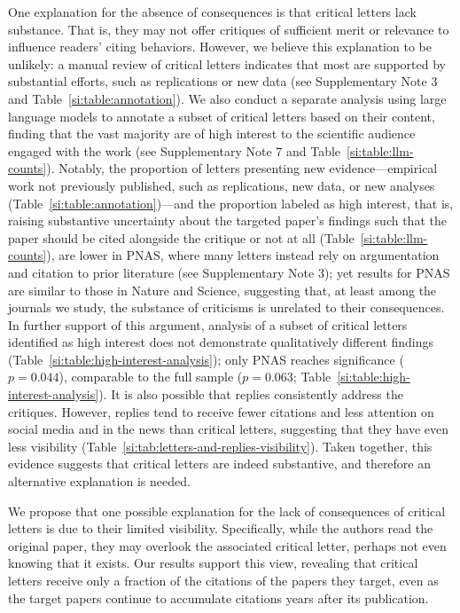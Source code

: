 \documentclass[12pt,a4paper]{article}
\numberwithin{equation}{section}
\begin{document}
One explanation for the absence of consequences is that critical letters lack substance.
That is, they may not offer critiques of sufficient merit or relevance to influence readers' citing behaviors.
However, we believe this explanation to be unlikely:
a manual review of critical letters indicates that most are supported by substantial efforts, such as replications or new data (see Supplementary Note 3 and Table~\ref{si:table:annotation}). 
We also conduct a separate analysis using large language models to annotate a subset of critical letters based on their content, finding that the vast majority are of high interest to the scientific audience engaged with the work (see Supplementary Note 7 and Table~\ref{si:table:llm-counts}). 
Notably, the proportion of letters presenting new evidence---empirical work not previously published, such as replications, new data, or new analyses (Table~\ref{si:table:annotation})---and the proportion labeled as high interest, that is, raising substantive uncertainty about the targeted paper's findings such that the paper should be cited alongside the critique or not at all (Table~\ref{si:table:llm-counts}), are lower in PNAS, where many letters instead rely on argumentation and citation to prior literature (see Supplementary Note 3);
yet results for PNAS are similar to those in Nature and Science, suggesting that, at least among the journals we study, the substance of criticisms is unrelated to their consequences.
In further support of this argument, analysis of a subset of critical letters identified as high interest does not demonstrate qualitatively different findings (Table~\ref{si:table:high-interest-analysis}); only PNAS reaches significance ($p = 0.044$), comparable to the full sample ($p = 0.063$; Table~\ref{si:table:high-interest-analysis}). 
It is also possible that replies consistently address the critiques.
However, replies tend to receive fewer citations and less attention on social media and in the news than critical letters, suggesting that they have even less visibility (Table~\ref*{si:tab:letters-and-replies-visibility}).
Taken together, this evidence suggests that critical letters are indeed substantive, and therefore an alternative explanation is needed.

We propose that one possible explanation for the lack of consequences of critical letters is due to their limited visibility.
Specifically, while the authors read the original paper, they may overlook the associated critical letter, perhaps not even knowing that it exists.
Our results support this view, revealing that critical letters receive only a fraction of the citations of the papers they target, even as the target papers continue to accumulate citations years after its publication. 
\end{document}
